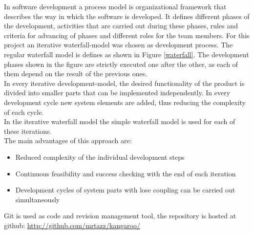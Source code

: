 In software development a process model is organizational framework that describes the way in which the software is developed. It defines different phases of the development, activities that are carried out during these phases, rules and criteria for advancing of phases and different roles for the team members. For this project an iterative waterfall-model was chosen as development process. 
The regular waterfall model is defines as shown in Figure \ref{waterfall}. The development phases shown in the figure are strictly executed one after the other, as each of them depend on the result of the previous ones. \\ In every iterative development-model, the desired functionality of the product is divided into smaller parts that can be implemented independently. In every development cycle new system elements are added, thus reducing the  complexity of each cycle.\\ In the iterative waterfall model the simple waterfall model is used for each of these iterations. \\ The main advantages of this approach are:
\begin{itemize}
\item Reduced complexity of the individual development steps
\item Continuous feasibility and success checking with the end of each iteration
\item Development cycles of system parts with lose coupling can be carried out simultaneously
\end{itemize}
Git is used as code and revision management tool, the repository is hosted at github: \url{http://github.com/mrtazz/kangaroo/}



